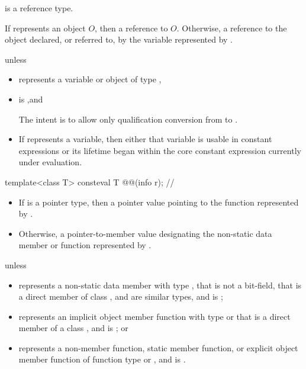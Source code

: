 \begin{itemdescr}
\pnum
\begin{note}
 is a reference type.
\end{note}

\pnum
\returns
If  represents an object $O$,
then a reference to $O$.
Otherwise, a reference to the object declared, or referred to,
by the variable represented by .

\pnum
\throws
{} unless
\begin{itemize}
\item
   represents a variable or object of type ,
\item
  is ,\newline and
  \begin{note}
  The intent is to allow only qualification conversion from  to .
  \end{note}
\item
  If  represents a variable,
  then either that variable is usable in constant expressions
  or its lifetime began within the core constant expression currently under evaluation.
\end{itemize}
\end{itemdescr}

\begin{itemdecl}
template<class T>
  consteval T @@(info r);       // \expos
\end{itemdecl}

\begin{itemdescr}
\pnum
\returns
\begin{itemize}
\item
  If  is a pointer type,
  then a pointer value pointing to the function represented by .
\item
  Otherwise, a pointer-to-member value
  designating the non-static data member or function represented by .
\end{itemize}

\pnum
\throws
{} unless
\begin{itemize}
\item
   represents a non-static data member with type ,
  that is not a bit-field,
  that is a direct member of class ,
   and  are similar types, and
   is ;
\item
   represents an implicit object member function
  with type  or 
  that is a direct member of a class ,
  and  is ; or
\item
   represents a non-member function,
  static member function, or
  explicit object member function
  of function type  or ,
  and  is .
\end{itemize}
\end{itemdescr}

